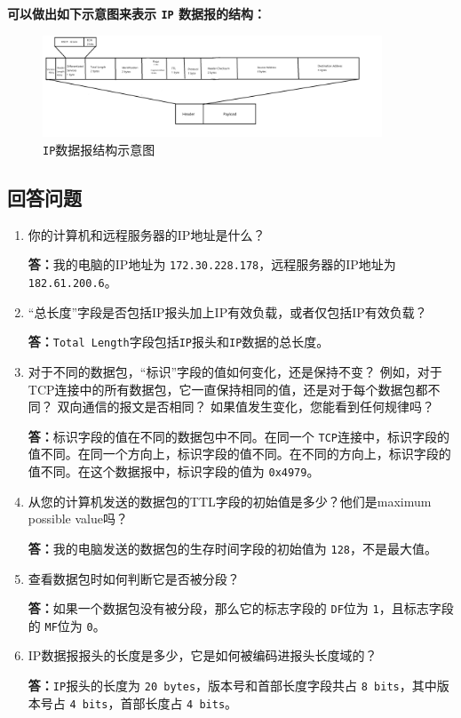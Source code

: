 \documentclass{article}
\begin{document}
\textbf{可以做出如下示意图来表示 \texttt{IP} 数据报的结构：}

\begin{figure}[H]
  \centering
  \includegraphics[width=0.9\textwidth]{img/21.png}
  \caption{\texttt{IP}数据报结构示意图}
  \label{fig:20}
\end{figure}

\subsection{回答问题}

\begin{enumerate}[noitemsep]
  \item 你的计算机和远程服务器的IP地址是什么？ 

        \textbf{答：}我的电脑的IP地址为 \texttt{172.30.228.178}，远程服务器的IP地址为 \texttt{182.61.200.6}。
  \item “总长度”字段是否包括IP报头加上IP有效负载，或者仅包括IP有效负载？

        \textbf{答：}\texttt{Total Length}字段包括\texttt{IP}报头和\texttt{IP}数据的总长度。
  \item 对于不同的数据包，“标识”字段的值如何变化，还是保持不变？ 例如，对于TCP连接中的所有数据包，它一直保持相同的值，还是对于每个数据包都不同？ 双向通信的报文是否相同？ 如果值发生变化，您能看到任何规律吗？

        \textbf{答：}标识字段的值在不同的数据包中不同。在同一个 \texttt{TCP}连接中，标识字段的值不同。在同一个方向上，标识字段的值不同。在不同的方向上，标识字段的值不同。在这个数据报中，标识字段的值为 \texttt{0x4979}。
  \item 从您的计算机发送的数据包的TTL字段的初始值是多少？他们是maximum possible value吗？

        \textbf{答：}我的电脑发送的数据包的生存时间字段的初始值为 \texttt{128}，不是最大值。
  \item 查看数据包时如何判断它是否被分段？

        \textbf{答：}如果一个数据包没有被分段，那么它的标志字段的 \texttt{DF}位为 \texttt{1}，且标志字段的 \texttt{MF}位为 \texttt{0}。
  \item IP数据报报头的长度是多少，它是如何被编码进报头长度域的？

        \textbf{答：}\texttt{IP}报头的长度为 \texttt{20 bytes}，版本号和首部长度字段共占 \texttt{8 bits}，其中版本号占 \texttt{4 bits}，首部长度占 \texttt{4 bits}。
\end{enumerate}
\end{document}
